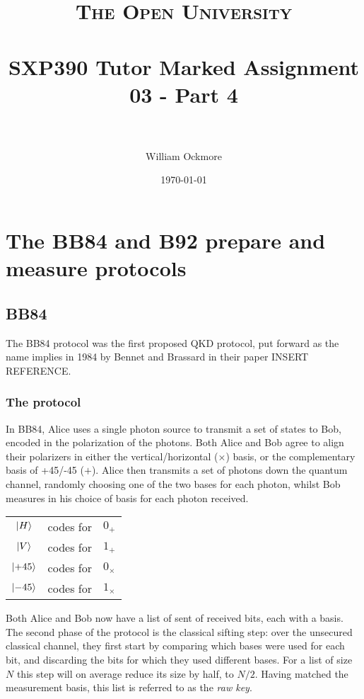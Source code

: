 \documentclass[paper=a4, fontsize=11pt]{scrartcl} %
\title{
\normalfont \normalsize
\textsc{The Open University} \\ [25pt] %
\horrule{0.5pt} \\[0.4cm] %
\huge SXP390 Tutor Marked Assignment 03 - Part 4 \\ %
\horrule{2pt} \\[0.5cm] %
}
\author{William Ockmore} %
\date{\normalsize\today} %
\numberwithin{equation}{section} %
\numberwithin{figure}{section} %
\numberwithin{table}{section} %
\begin{document}
\maketitle %


\section{The BB84 and B92 prepare and measure protocols}

\subsection{BB84}

The BB84 protocol was the first proposed QKD protocol, put forward as the name implies in
1984 by Bennet and Brassard in their paper INSERT REFERENCE.

\subsubsection{The protocol}
In BB84, Alice uses a single photon source to transmit a set of states to Bob,
encoded in the polarization of the photons. Both Alice and Bob agree to align
their polarizers in either the vertical/horizontal ($\times$) basis, or the
complementary basis of +45/-45 ($+$). Alice then transmits a set of photons
down the quantum channel, randomly choosing one of the two bases for each
photon, whilst Bob measures in his choice of basis for each photon received.

\begin{center}
\begin{tabular}{c c c}
	$\ket{H}$  & codes for & $0_+$ \\
	$\ket{V}$  & codes for & $1_+$ \\
	$\ket{+45}$  & codes for & $0_\times$ \\
	$\ket{-45}$  & codes for & $1_\times$ \\
\end{tabular}
\end{center}

Both Alice and Bob now have a list of sent of received bits, each with a basis. The second
phase of the protocol is the classical sifting step: over the unsecured classical channel, they
first start by comparing which bases were used for each bit, and discarding the bits for which
they used different bases. For a list of size $N$ this step will on average reduce its size by half,
to $N/2$. Having matched the measurement basis, this list is referred to as the \textit{raw key}.
\end{document}
